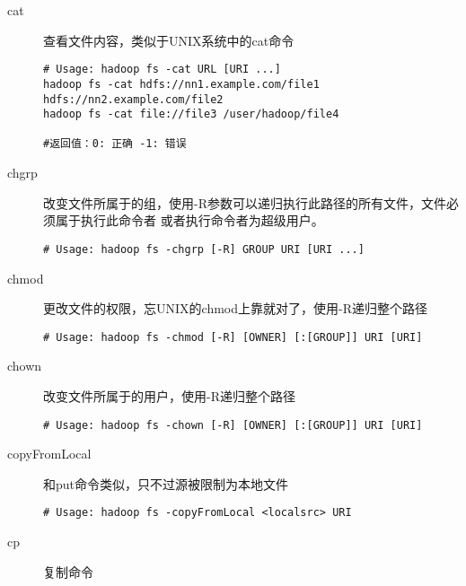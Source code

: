\documentclass{article}
\begin{document}
\begin{description}
\item[cat] 查看文件内容，类似于UNIX系统中的cat命令

\begin{verbatim}
# Usage: hadoop fs -cat URL [URI ...]
hadoop fs -cat hdfs://nn1.example.com/file1 hdfs://nn2.example.com/file2
hadoop fs -cat file://file3 /user/hadoop/file4

#返回值：0: 正确 -1: 错误
\end{verbatim}


\item[chgrp] 改变文件所属于的组，使用-R参数可以递归执行此路径的所有文件，文件必须属于执行此命令者
或者执行命令者为超级用户。

\begin{verbatim}
# Usage: hadoop fs -chgrp [-R] GROUP URI [URI ...]

\end{verbatim}

\item[chmod] 更改文件的权限，忘UNIX的chmod上靠就对了，使用-R递归整个路径

\begin{verbatim}
# Usage: hadoop fs -chmod [-R] [OWNER] [:[GROUP]] URI [URI]
\end{verbatim}

\item[chown] 改变文件所属于的用户，使用-R递归整个路径

\begin{verbatim}
# Usage: hadoop fs -chown [-R] [OWNER] [:[GROUP]] URI [URI]
\end{verbatim}

\item[copyFromLocal] 和put命令类似，只不过源被限制为本地文件

\begin{verbatim}
# Usage: hadoop fs -copyFromLocal <localsrc> URI
\end{verbatim}

\item[cp] 复制命令


\end{description}
\end{document}
